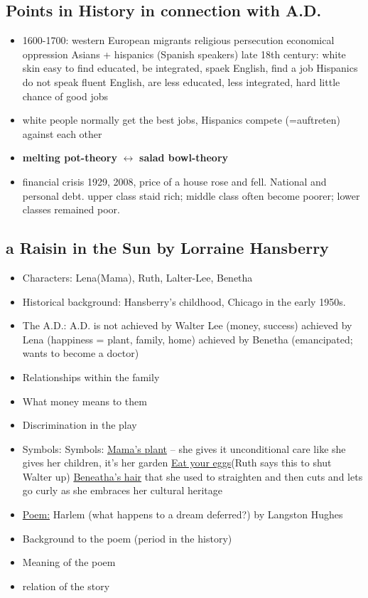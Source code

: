 \documentclass[a5paper,12pt,twoside,titlepage]{scrartcl}
\begin{document}
	\subsection{Points in History in connection with A.D.}
		\begin{itemize}
			\item 1600-1700: 
				\subitem western European migrants
				\subitem religious persecution 
				\subitem economical oppression
				\subitem Asians + hispanics (Spanish speakers)
				\subitem late 18th century: 
				\subitem white skin easy to find educated, be integrated,
				\subitem spaek English, find a job
				\subitem Hispanics do not speak fluent English, are less educated, less integrated, hard little chance of good jobs
			\item white people normally get the best jobs, Hispanics compete (=auftreten) against each other
			\item \textbf{melting pot-theory} $\leftrightarrow$ \textbf{salad bowl-theory} 
			\item financial crisis 1929, 2008, price of a house rose and fell. National and personal debt.
			\subitem  upper class staid rich; middle class often become poorer; lower classes remained poor.
		\end{itemize}
	\subsection{a Raisin in the Sun by Lorraine Hansberry}
		\begin{itemize}
			\item Characters: Lena(Mama), Ruth, Lalter-Lee, Benetha
			\item Historical background: Hansberry's childhood, Chicago in the early 1950s.
			\item The A.D.:
			\subitem A.D. is not achieved by Walter Lee (money, success)
			\subitem achieved by Lena (happiness = plant, family, home)
			\subitem achieved by Benetha (emancipated; wants to become a doctor)
			\item Relationships within the family
			\item What money means to them
			\item Discrimination in the play
			\item Symbols:
			\subitem Symbols: \underline{Mama’s plant} – she gives it unconditional care  like she gives her children, it’s her garden
			\subitem \glqq \underline{Eat your eggs}\grqq (Ruth says this to shut Walter up)
			\subitem \underline{Beneatha’s hair} that she used to straighten and then cuts and lets go curly as she embraces her cultural heritage
			\item \underline{Poem:} Harlem (what happens to a dream deferred?) by Langston Hughes
			\item Background to the poem (period in the history)
			\item Meaning of the poem
			\item relation of the story
			
		\end{itemize}
\end{document}
